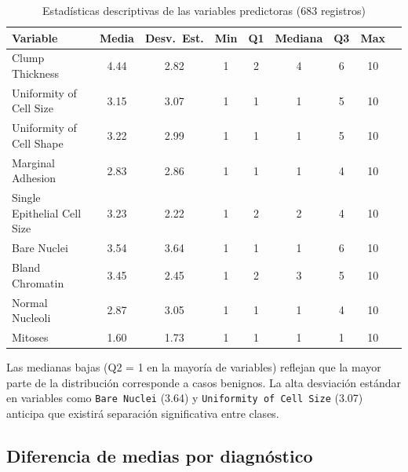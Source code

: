 \documentclass[11pt,a4paper]{article}
\begin{document}
\begin{table}[H]
\centering
\caption{Estadísticas descriptivas de las variables predictoras (683 registros)}
\small
\renewcommand{\arraystretch}{1.1}
\begin{tabular}{lcccccccc}
\toprule
\textbf{Variable} & \textbf{Media} & \textbf{Desv.\ Est.} & \textbf{Min} & \textbf{Q1} & \textbf{Mediana} & \textbf{Q3} & \textbf{Max} \\
\midrule
Clump Thickness & 4.44 & 2.82 & 1 & 2 & 4 & 6 & 10 \\
Uniformity of Cell Size & 3.15 & 3.07 & 1 & 1 & 1 & 5 & 10 \\
Uniformity of Cell Shape & 3.22 & 2.99 & 1 & 1 & 1 & 5 & 10 \\
Marginal Adhesion & 2.83 & 2.86 & 1 & 1 & 1 & 4 & 10 \\
Single Epithelial Cell Size & 3.23 & 2.22 & 1 & 2 & 2 & 4 & 10 \\
Bare Nuclei & 3.54 & 3.64 & 1 & 1 & 1 & 6 & 10 \\
Bland Chromatin & 3.45 & 2.45 & 1 & 2 & 3 & 5 & 10 \\
Normal Nucleoli & 2.87 & 3.05 & 1 & 1 & 1 & 4 & 10 \\
Mitoses & 1.60 & 1.73 & 1 & 1 & 1 & 1 & 10 \\
\bottomrule
\end{tabular}
\normalsize
\end{table}

Las medianas bajas (Q2 = 1 en la mayoría de variables) reflejan que la mayor parte de la distribución corresponde a casos benignos. La alta desviación estándar en variables como \texttt{Bare Nuclei} (3.64) y \texttt{Uniformity of Cell Size} (3.07) anticipa que existirá separación significativa entre clases.

\subsection{Diferencia de medias por diagnóstico}
\end{document}
